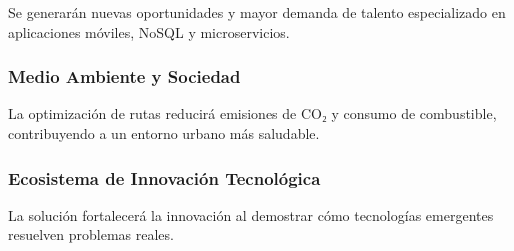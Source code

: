 Se generarán nuevas oportunidades y mayor demanda de talento especializado en aplicaciones móviles, NoSQL y microservicios.

\subsubsection{Medio Ambiente y Sociedad}

La optimización de rutas reducirá emisiones de CO₂ y consumo de combustible, contribuyendo a un entorno urbano más saludable.

\subsubsection{Ecosistema de Innovación Tecnológica}

La solución fortalecerá la innovación al demostrar cómo tecnologías emergentes resuelven problemas reales.